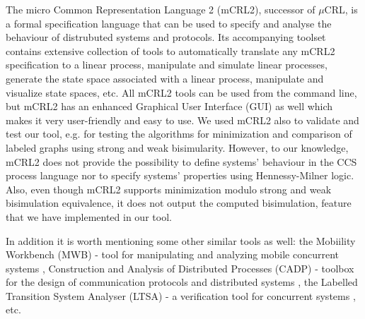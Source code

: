 The micro Common Representation Language 2 (mCRL2), successor of $\mu$CRL, is a formal specification language that can be used to specify and analyse the behaviour of distrubuted systems and protocols. Its accompanying toolset contains extensive collection of tools to automatically translate any mCRL2 specification to a linear process, manipulate and simulate linear processes, generate the state space associated with a linear process, manipulate and visualize state spaces, etc. All mCRL2 tools can be used from the command line, but mCRL2 has an enhanced Graphical User Interface (GUI) as well which makes it very user-friendly and easy to use. We used mCRL2 also to validate and test our tool, e.g. for testing the algorithms for minimization and comparison of labeled graphs using strong and weak bisimularity. However, to our knowledge, mCRL2 does not provide the possibility to define systems' behaviour in the CCS process language nor to specify systems' properties using Hennessy-Milner logic. Also, even though mCRL2 supports minimization modulo strong and weak bisimulation equivalence, it does not output the computed bisimulation, feature that we have implemented in our tool.  

In addition it is worth mentioning some other similar tools as well: the Mobiility Workbench (MWB) - tool for manipulating and analyzing mobile concurrent systems \cite{MWB}, Construction and Analysis of Distributed Processes (CADP) - toolbox for the design of communication protocols and distributed systems \cite{CADP}, the Labelled Transition System Analyser (LTSA) - a verification tool for concurrent systems \cite{LTSA}, etc.
 
